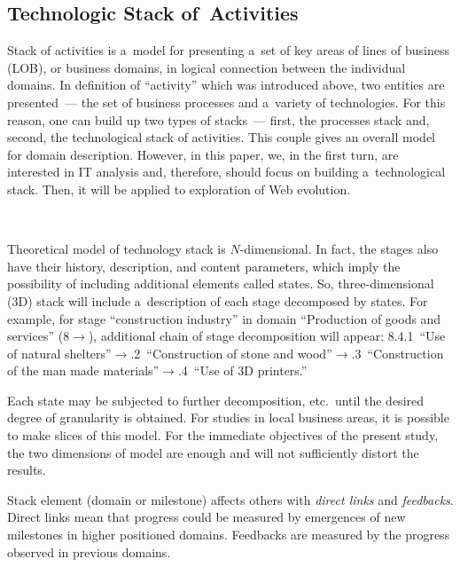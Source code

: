\begin{multicols}{2}
\section{Technologic Stack of~Activities}

\noindent
Stack of activities is a~model for presenting a~set of key areas of lines of business (LOB), or business
domains, in logical connection between the individual domains. In definition of ``activity'' which was
introduced above, two entities are presented~--- the set of business processes and a~variety of technologies.
For this reason, one can build up two types of stacks~--- first, the processes stack and, second, the
technological stack of activities. This couple gives an overall model for domain description. However, in
this paper, we, in the first turn, are interested in IT analysis and,
 therefore, should focus on building
a~technological stack. Then, it will be applied to exploration of Web evolution.

\begin{figure*} %
\vspace*{1pt}
 \begin{center}
 \mbox{%
 \epsfxsize=120.259mm
 }
 \end{center}
\end{figure*}

Theoretical model of technology stack is \mbox{$N$-dimensional}. In fact, the stages also have their history,
description, and content parameters, which imply the possibility of including additional elements called
states. So, three-dimensional (3D) stack will include a~description of each stage decomposed by states. For example, for stage
``construction industry'' in domain ``Production of goods and services'' (8\;$\to$), additional chain of
stage decomposition will appear: 8.4.1~``Use of natural shelters''\;$\to$.2~``Construction of stone and
wood''\;$\to$.3~``Construction of the man made materials''\;$\to$.4~``Use of 3D printers.''

 Each state may be subjected to further decomposition, etc.\ until
 the desired degree of granularity is
obtained. For studies in local business areas, it is possible to make slices of this model. For the immediate
objectives of the present study, the two dimensions of model are enough and will not sufficiently distort the
results.
{

}

 Stack element (domain or milestone) affects others with \textit{direct links} and \textit{feedbacks}. Direct
links mean that progress could be measured by emergences of new milestones in higher positioned
domains. Feedbacks are measured by the progress observed in previous domains.


\end{multicols}
